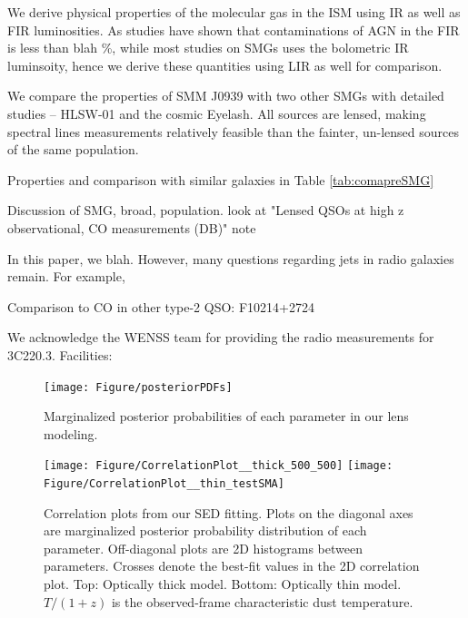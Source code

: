 \documentclass[twocolumn,apj,numberedappendix]{emulateapj}
\begin{document}
We derive physical properties of the molecular gas in the ISM using IR as well as FIR luminosities. As studies have shown that contaminations of AGN in the FIR is less than blah \%, while most studies on SMGs uses the bolometric IR luminsoity, hence we derive these quantities using LIR as well for comparison. 

We compare the properties of SMM J0939 with two other SMGs with detailed studies -- HLSW-01 and the cosmic Eyelash. All sources are lensed, making spectral lines measurements relatively feasible than the fainter, un-lensed sources of the same population.

Properties and comparison with similar galaxies in Table \ref{tab:comapreSMG}

Discussion of SMG, broad, population.
look at "Lensed QSOs at high z observational, CO measurements (DB)" note

In this paper, we blah. However, many questions regarding jets in radio galaxies remain. For example,

Comparison to CO in other type-2 QSO: F10214+2724 \citep{Riechers11a}

\acknowledgments

We acknowledge the WENSS team for providing the radio measurements for 3C220.3.
Facilities: 




\appendix

\begin{figure}[!tbp]
\centering
\texttt{[image: Figure/posteriorPDFs]}
\caption{Marginalized posterior probabilities of each parameter in our lens modeling.
\label{fig:LensPDF}}
\end{figure}

\begin{figure}[!tbp]
\centering
\texttt{[image: Figure/CorrelationPlot\_\_thick\_500\_500]}
\texttt{[image: Figure/CorrelationPlot\_\_thin\_testSMA]}
\caption{Correlation plots from our SED fitting. Plots on the diagonal axes are marginalized posterior probability 
distribution of each
parameter. Off-diagonal plots are 2D histograms between parameters. Crosses denote the best-fit values in 
the 2D correlation plot. Top: Optically thick
model. Bottom: Optically thin model. $T/(1+z)$ is the observed-frame characteristic dust temperature.
\label{fig:sedlikelihood}}
\end{figure}
\end{document}
